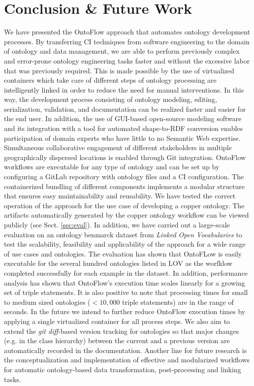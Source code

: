 \documentclass[sigconf]{acmart}
\begin{document}
\section{Conclusion \& Future Work}
\label{sec:final}
We have presented the OntoFlow approach that automates ontology development processes. By transferring CI techniques from software engineering to the domain of ontology and data management, we are able to perform previously complex and error-prone ontology engineering tasks faster and without the excessive labor that was previously required. This is made possible by the use of virtualized containers which take care of different steps of ontology processing are intelligently linked in order to reduce the need for manual interventions. In this way, the development process consisting of ontology modeling, editing, serialization, validation, and documentation can be realized faster and easier for the end user. In addition, the use of GUI-based open-source modeling software and its integration with a tool for automated shape-to-RDF conversion enables participation of domain experts who have little to no Semantic Web expertise. Simultaneous collaborative engagement of different stakeholders in multiple geographically dispersed locations is enabled through Git integration. OntoFlow workflows are executable for any type of ontology and can be set up by configuring a GitLab repository with ontology files and a CI configuration. The containerized bundling of different components implements a modular structure that ensures easy maintainability and reusability. We have tested the correct operation of the approach for the use case of developing a copper ontology. The artifacts automatically generated by the copper ontology workflow can be viewed publicly (see Sect. \ref{sec:eval}). In addition, we have carried out a large-scale evaluation on an ontology benmarck dataset from \textit{Linked Open Vocabularies} to test the scalability, feasibility and applicability of the approach for a wide range of use cases and ontologies. The evaluation has shown that OntoFLow is easily executable for the several hundred ontologies listed in LOV as the worfklow completed successfully for each example in the dataset. In addition, performance analysis has shown that OntoFlow's execution time scales linearly for a growing set of triple statements. It is also positive to note that processing times for small to medium sized ontologies ($< 10,000$ triple statements) are in the range of seconds. In the future we intend to further reduce OntoFlow execution times by applying a single virtualized container for all process steps. 
We also aim to extend the \textit{git diff}-based version tracking for ontologies so that major changes (e.g. in the class hierarchy) between the current and a previous version are automatically recorded in the documentation. Another line for future research is the conceptualization and implementation of effective and modularized workflows for automatic ontology-based data transformation, post-processing and linking tasks. 



\end{document}
